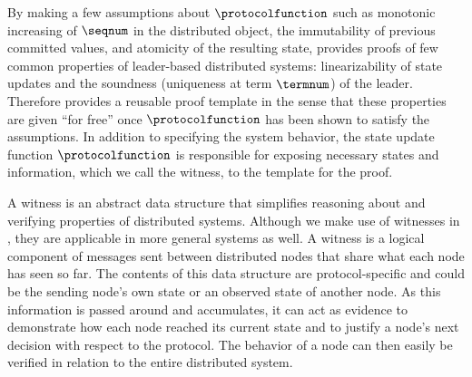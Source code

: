 

By making a few assumptions  about $\protocolfunction$
such as monotonic increasing of $\seqnum$ in the distributed object,
the immutability of previous committed values, and atomicity of the resulting
state, \sysname{} provides proofs of few common properties of leader-based distributed systems:
linearizability of state updates and the soundness (uniqueness at term $\termnum$)
of the leader.
Therefore \sysname{} provides a reusable proof template in the sense that these properties
are given ``for free'' once $\protocolfunction$ has been shown to satisfy the assumptions.
In addition to specifying the system behavior,
the state update function $\protocolfunction$ is responsible for exposing necessary
states and information, which we call the witness, to the template for the proof.


A witness is an abstract data structure that simplifies reasoning about and
verifying properties of distributed systems. Although we make use of witnesses
in \sysname{}, they are applicable in more general systems as well. A witness is
a logical component of messages sent between distributed nodes that share what
each node has seen so far. The contents of this data structure are
protocol-specific and could be the sending node's own state or an observed state
of another node. As this information is passed around and accumulates, it can
act as evidence to demonstrate how each node reached its current state and to
justify a node's next decision with respect to the protocol. The behavior of a
node can then easily be verified in relation to the entire distributed system.


